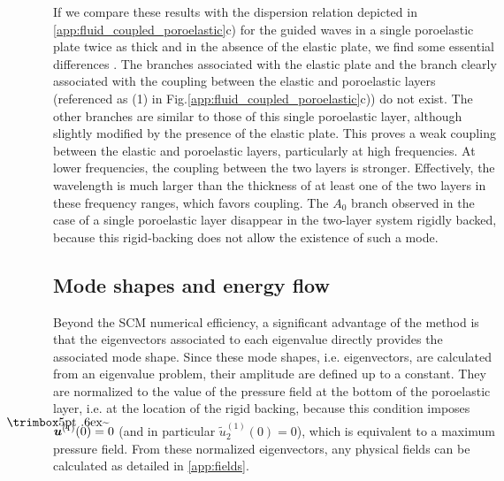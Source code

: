     If we compare these results with the dispersion relation depicted in \ref{app:fluid_coupled_poroelastic}c) for the guided waves in a single poroelastic plate twice as thick and in the absence of the elastic plate, we find some essential differences . The branches associated with the elastic plate and the branch clearly associated with the coupling between the elastic and poroelastic layers (referenced as (1) in Fig.\ref{app:fluid_coupled_poroelastic}c)) do not exist. The other branches are similar to those of this single poroelastic layer, although slightly modified by the presence of the elastic plate. This proves a weak coupling between the elastic and poroelastic layers, particularly at high frequencies. At lower frequencies, the coupling between the two layers is stronger. Effectively, the wavelength is much larger than the thickness of at least one of the two layers in these frequency ranges, which favors coupling. The $A_0$ branch observed in the case of a single poroelastic layer disappear in the two-layer system rigidly backed, because this rigid-backing does not allow the existence of such a mode.
    
    \subsection{Mode shapes and energy flow}
    \label{sec:results_shapes}
    Beyond the SCM numerical efficiency, a significant advantage of the method is that the eigenvectors associated to each eigenvalue directly provides the associated mode shape. Since these mode shapes, i.e. eigenvectors, are calculated from an eigenvalue problem, their amplitude are defined up to a constant. They are normalized to the value of the pressure field at the bottom of the poroelastic layer, i.e. at the location of the rigid backing, because this condition imposes $\tilde{\mbf u}^{(1)}(0) = 0$ (and in particular $\tilde{u}_2^{(1)}(0) = 0$), which is equivalent to a maximum pressure field. From these normalized eigenvectors, any physical fields can be calculated as detailed in \ref{app:fields}.   \\

